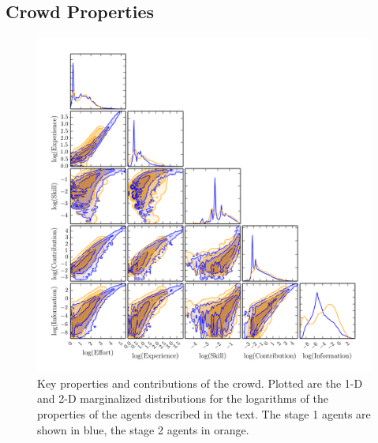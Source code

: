 \documentclass[useAMS,usenatbib,a4paper]{mn2e}
\begin{document}

\subsection{Crowd Properties}
\label{sec:results:crowd}


\begin{figure}
\centering\includegraphics[width=0.9\linewidth]{sw-system-figs/all_skill_contribution_experience_education.png}
\caption{Key properties and contributions of the \sw crowd. Plotted are the
1-D and 2-D marginalized distributions for the logarithms of the 
properties of the agents described in the text. The stage 1 agents are shown
in blue, the stage 2 agents in orange.}
\label{fig:crowd:cornerplot}
\end{figure}
\end{document}
